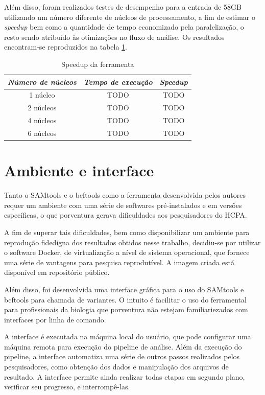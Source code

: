 \documentclass[cic,tc]{iiufrgs}
\begin{document}
Além disso, foram realizados testes de desempenho para a entrada de 58GB
utilizando um número diferente de núcleos de processamento, a fim de estimar o
\textit{speedup} bem como a quantidade de tempo economizado pela paralelização,
o resto sendo atribuído às otimizações no fluxo de análise. Os resultados
encontram-se reproduzidos na tabela \ref{tbl:speedup}.

\begin{table}[h]
    \caption{Speedup da ferramenta}
    \centering
        \begin{tabular}{c|c|c}
          \hline
          \textit{Número de núcleos}  &   \textit{Tempo de execução}  & \textit{Speedup} \\
          \hline
          \hline
          1 núcleo & TODO & TODO \\
          2 núcleos & TODO & TODO \\
          4 núcleos & TODO & TODO \\
          6 núcleos & TODO & TODO \\
          \hline
        \end{tabular}
    \label{tbl:speedup}
\end{table}

\section{Ambiente e interface}

Tanto o SAMtools e o bcftools como a ferramenta desenvolvida pelos autores
requer um ambiente com uma série de softwares pré-instalados e em versões
específicas, o que porventura gerava dificuldades aos pesquisadores do HCPA.

A fim de superar tais dificuldades, bem como disponibilizar um ambiente para
reprodução fidedigna dos resultados obtidos nesse trabalho, decidiu-se por
utilizar o software Docker, de virtualização a nível de sistema operacional,
que fornece uma série de vantagens para pesquisa
reprodutível.\cite{boettiger2015introduction} A imagem criada está disponível
em repositório público.\cite{dockerme}

Além disso, foi desenvolvida uma interface gráfica para o uso do SAMtools e
bcftools para chamada de variantes. O intuito é facilitar o uso do ferramental
para profissionais da biologia que porventura não estejam familiariezados com
interfaces por linha de comando.

A interface é executada na máquina local do usuário, que pode configurar uma
máquina remota para execução do pipeline de análise. Além da execução do
pipeline, a interface automatiza uma série de outros passos realizados pelos
pesquisadores, como obtenção dos dados e manipulação dos arquivos de resultado.
A interface permite ainda realizar todas etapas em segundo plano, verificar seu
progresso, e interrompê-las.
\end{document}
